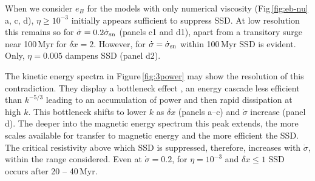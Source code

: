 \documentclass[preprint2]{aastex63}
\newcommand\SNr{\dot\sigma_{\rm sn}}
\newcommand\Ms{M_{\rm s}}
\newcommand\dx{ {\delta x}}
\begin{document}
{ {When we consider $e_B$ for the models {with} only numerical
 viscosity
 (Fig\,\ref{fig:eb-nu} a, c, d), $\eta\geq10^{-3}$ initially appears
 sufficient to suppress SSD.
 At low resolution this remains so for $\dot\sigma=0.2\SNr$ (panels c1 and d1),
 apart from a transitory surge near 100\,Myr for $\dx=2$.
 However, for $\dot\sigma=\SNr$ within 100\,Myr SSD is evident.
 Only, $\eta=0.005$ dampens SSD (panel d2).}

 {The kinetic energy spectra in Figure\,\ref{fig:3power}} may
 show the resolution of this contradiction.
 They display a bottleneck effect \citep{Falkovich94,HBD03}, an energy cascade
 less efficient than $k^{-5/3}$
 leading to an accumulation of power and then rapid dissipation at high $k$.
 This bottleneck shifts to lower $k$ as $\dx$
 {(panels a--c) and $\dot\sigma$ increase (panel d).}
 {The deeper into the magnetic energy spectrum this peak extends, the more 
 scales available for transfer to magnetic energy and the more
 efficient the SSD.
 The critical resistivity above which SSD is suppressed, therefore, 
 increases with $\dot\sigma$, within the range considered. 
 Even at $\dot\sigma=0.2$, for $\eta=10^{-3}$ and $\dx\leq1$ SSD occurs after
 20 -- 40\,Myr.}

}
\end{document}
